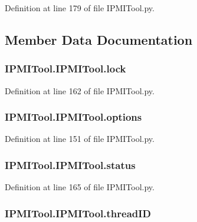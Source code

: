 Definition at line 179 of file I\-P\-M\-I\-Tool.\-py.



\subsection{Member Data Documentation}
\hypertarget{class_i_p_m_i_tool_1_1_i_p_m_i_tool_a36a9429fca7200e0a6d1d78002b95d11}{
\subsubsection[{lock}]{\setlength{\rightskip}{0pt plus 5cm}I\-P\-M\-I\-Tool.\-I\-P\-M\-I\-Tool.\-lock}}\label{class_i_p_m_i_tool_1_1_i_p_m_i_tool_a36a9429fca7200e0a6d1d78002b95d11}


Definition at line 162 of file I\-P\-M\-I\-Tool.\-py.

\hypertarget{class_i_p_m_i_tool_1_1_i_p_m_i_tool_a9f0f9484b1b8f6a0df8338f7894c8823}{
\subsubsection[{options}]{\setlength{\rightskip}{0pt plus 5cm}I\-P\-M\-I\-Tool.\-I\-P\-M\-I\-Tool.\-options}}\label{class_i_p_m_i_tool_1_1_i_p_m_i_tool_a9f0f9484b1b8f6a0df8338f7894c8823}


Definition at line 151 of file I\-P\-M\-I\-Tool.\-py.

\hypertarget{class_i_p_m_i_tool_1_1_i_p_m_i_tool_a4dba85133ceca9edff481c575cb468d9}{
\subsubsection[{status}]{\setlength{\rightskip}{0pt plus 5cm}I\-P\-M\-I\-Tool.\-I\-P\-M\-I\-Tool.\-status}}\label{class_i_p_m_i_tool_1_1_i_p_m_i_tool_a4dba85133ceca9edff481c575cb468d9}


Definition at line 165 of file I\-P\-M\-I\-Tool.\-py.

\hypertarget{class_i_p_m_i_tool_1_1_i_p_m_i_tool_aaa15d2dc90d9e3a45adc4519912c811d}{
\subsubsection[{thread\-I\-D}]{\setlength{\rightskip}{0pt plus 5cm}I\-P\-M\-I\-Tool.\-I\-P\-M\-I\-Tool.\-thread\-I\-D}}\label{class_i_p_m_i_tool_1_1_i_p_m_i_tool_aaa15d2dc90d9e3a45adc4519912c811d}


